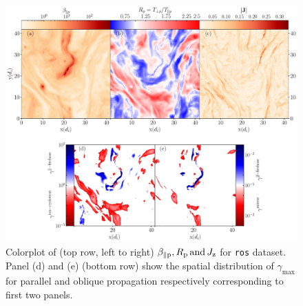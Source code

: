             \begin{figure}
                \begin{center}
                    \includegraphics[width=1\textwidth]{figures/chap5/3Ddata_Rp_betap_b_yan512_gamma_k_yan_512.pdf}
                    \caption[Plot of $\beta_{\parallel \rm p}, R_{\rm p}, J_{\rm z} \mathrm{\,and\,}
                    \gamma$ for \texttt{ros} dataset]{Colorplot of (top row, left to right)
                    $\beta_{\parallel \rm p}, R_{\rm p} \mathrm{\,and\,} J_{\rm z}$ for \texttt{ros}
                    dataset. Panel (d) and (e) (bottom row) show the spatial distribution of
                    $\gamma_{\max}$ for parallel and oblique propagation respectively corresponding
                    to first two panels.}
                    \label{fig:brjros}
                \end{center}
            \end{figure}


